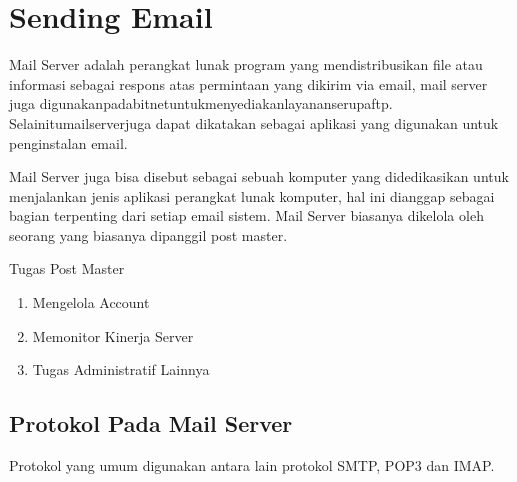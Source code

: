 
\section{Sending Email}
	Mail Server adalah perangkat lunak program yang mendistribusikan ﬁle atau informasi sebagai respons atas permintaan yang dikirim via email, mail server juga digunakanpadabitnetuntukmenyediakanlayananserupaftp. Selainitumailserverjuga dapat dikatakan sebagai aplikasi yang digunakan untuk penginstalan email.
	
	Mail Server juga bisa disebut sebagai sebuah komputer yang didedikasikan untuk menjalankan jenis aplikasi perangkat lunak komputer, hal ini dianggap sebagai bagian terpenting dari setiap email sistem. Mail Server biasanya dikelola oleh seorang yang biasanya dipanggil post master.
 
	Tugas Post Master
	\begin{enumerate}
		\item Mengelola Account  
		\item Memonitor Kinerja Server 
		\item Tugas Administratif Lainnya
	\end{enumerate}

\subsection {Protokol Pada Mail Server}
	Protokol yang umum digunakan antara lain protokol SMTP, POP3 dan IMAP.
	
